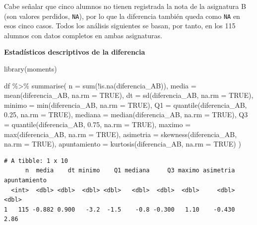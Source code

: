 \documentclass[
  spanish,
  a4paper,
]{scrreport}
\newenvironment{Shaded}{\begin{snugshade}}{\end{snugshade}}
\newcommand{\AttributeTok}[1]{\textcolor[rgb]{0.40,0.45,0.13}{#1}}
\newcommand{\ConstantTok}[1]{\textcolor[rgb]{0.56,0.35,0.01}{#1}}
\newcommand{\FloatTok}[1]{\textcolor[rgb]{0.68,0.00,0.00}{#1}}
\newcommand{\FunctionTok}[1]{\textcolor[rgb]{0.28,0.35,0.67}{#1}}
\newcommand{\NormalTok}[1]{\textcolor[rgb]{0.00,0.23,0.31}{#1}}
\newcommand{\SpecialCharTok}[1]{\textcolor[rgb]{0.37,0.37,0.37}{#1}}
\theoremstyle{definition}
\theoremstyle{definition}
\theoremstyle{remark}
\begin{document}
Cabe señalar que cinco alumnos no tienen registrada la nota de la
asignatura B (son valores perdidos, \texttt{NA}), por lo que la
diferencia también queda como \texttt{NA} en esos cinco casos. Todos los
análisis siguientes se basan, por tanto, en los 115 alumnos con datos
completos en ambas asignaturas.

\textbf{Estadísticos descriptivos de la diferencia}

\begin{Shaded}
\begin{Highlighting}[]
\FunctionTok{library}\NormalTok{(moments)}

\NormalTok{df }\SpecialCharTok{\%\textgreater{}\%}
  \FunctionTok{summarise}\NormalTok{(}
    \AttributeTok{n =} \FunctionTok{sum}\NormalTok{(}\SpecialCharTok{!}\FunctionTok{is.na}\NormalTok{(diferencia\_AB)),}
    \AttributeTok{media =} \FunctionTok{mean}\NormalTok{(diferencia\_AB, }\AttributeTok{na.rm =} \ConstantTok{TRUE}\NormalTok{),}
    \AttributeTok{dt =} \FunctionTok{sd}\NormalTok{(diferencia\_AB, }\AttributeTok{na.rm =} \ConstantTok{TRUE}\NormalTok{),}
    \AttributeTok{minimo =} \FunctionTok{min}\NormalTok{(diferencia\_AB, }\AttributeTok{na.rm =} \ConstantTok{TRUE}\NormalTok{),}
    \AttributeTok{Q1 =} \FunctionTok{quantile}\NormalTok{(diferencia\_AB, }\FloatTok{0.25}\NormalTok{, }\AttributeTok{na.rm =} \ConstantTok{TRUE}\NormalTok{),}
    \AttributeTok{mediana =} \FunctionTok{median}\NormalTok{(diferencia\_AB, }\AttributeTok{na.rm =} \ConstantTok{TRUE}\NormalTok{),}
    \AttributeTok{Q3 =} \FunctionTok{quantile}\NormalTok{(diferencia\_AB, }\FloatTok{0.75}\NormalTok{, }\AttributeTok{na.rm =} \ConstantTok{TRUE}\NormalTok{),}
    \AttributeTok{maximo =} \FunctionTok{max}\NormalTok{(diferencia\_AB, }\AttributeTok{na.rm =} \ConstantTok{TRUE}\NormalTok{),}
    \AttributeTok{asimetria =} \FunctionTok{skewness}\NormalTok{(diferencia\_AB, }\AttributeTok{na.rm =} \ConstantTok{TRUE}\NormalTok{),}
    \AttributeTok{apuntamiento =} \FunctionTok{kurtosis}\NormalTok{(diferencia\_AB, }\AttributeTok{na.rm =} \ConstantTok{TRUE}\NormalTok{)}
\NormalTok{  )}
\end{Highlighting}
\end{Shaded}

\begin{verbatim}
# A tibble: 1 x 10
      n  media    dt minimo    Q1 mediana     Q3 maximo asimetria apuntamiento
  <int>  <dbl> <dbl>  <dbl> <dbl>   <dbl>  <dbl>  <dbl>     <dbl>        <dbl>
1   115 -0.882 0.900   -3.2  -1.5    -0.8 -0.300   1.10    -0.430         2.86
\end{verbatim}
\end{document}
